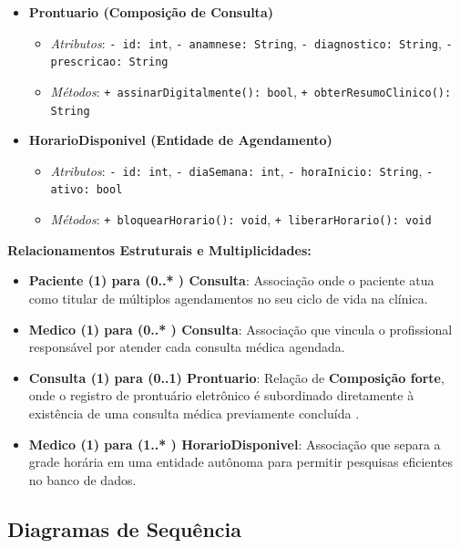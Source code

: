\begin{itemize}
\begin{itemize}
        \item \textit{Métodos}: \texttt{+ confirmar(): void}, \texttt{+ cancelar(motivo: String): void}, \texttt{+ concluir(): void}
    \end{itemize}
    \item \textbf{Prontuario (Composição de Consulta)}
    \begin{itemize}
        \item \textit{Atributos}: \texttt{- id: int}, \texttt{- anamnese: String}, \texttt{- diagnostico: String}, \texttt{- prescricao: String}
        \item \textit{Métodos}: \texttt{+ assinarDigitalmente(): bool}, \texttt{+ obterResumoClinico(): String}
    \end{itemize}
    \item \textbf{HorarioDisponivel (Entidade de Agendamento)}
    \begin{itemize}
        \item \textit{Atributos}: \texttt{- id: int}, \texttt{- diaSemana: int}, \texttt{- horaInicio: String}, \texttt{- ativo: bool}
        \item \textit{Métodos}: \texttt{+ bloquearHorario(): void}, \texttt{+ liberarHorario(): void}
    \end{itemize}
\end{itemize}

\textbf{Relacionamentos Estruturais e Multiplicidades:}
\begin{itemize}
    \item \textbf{Paciente (1) para (0..* ) Consulta}: Associação onde o paciente atua como titular de múltiplos agendamentos no seu ciclo de vida na clínica.
    \item \textbf{Medico (1) para (0..* ) Consulta}: Associação que vincula o profissional responsável por atender cada consulta médica agendada.
    \item \textbf{Consulta (1) para (0..1) Prontuario}: Relação de \textbf{Composição forte}, onde o registro de prontuário eletrônico é subordinado diretamente à existência de uma consulta médica previamente concluída \cite{larman2004}.
    \item \textbf{Medico (1) para (1..* ) HorarioDisponivel}: Associação que separa a grade horária em uma entidade autônoma para permitir pesquisas eficientes no banco de dados.
\end{itemize}

\subsection{Diagramas de Sequência}

